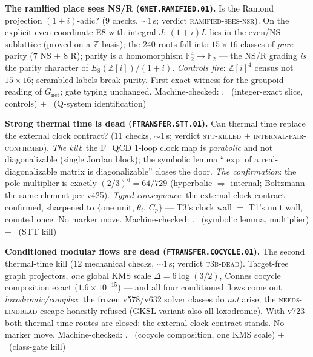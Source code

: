 \documentclass[11pt,a4paper]{article}
\newcommand{\Z}{\mathbb{Z}}
\theoremstyle{definition}
\begin{document}
\par\smallskip\noindent\textbf{The ramified place sees NS/R
(\texttt{GNET.RAMIFIED.01}).}
Is the Ramond projection $(1{+}i)$-adic? ($9$ checks, ${\sim}1$\,s;
verdict \textsc{ramified-sees-nsr}).  On the explicit
even-coordinate E8 with integral $J$: $(1{+}i)L$ lies in the even/NS
sublattice (proved on a $\Z$-basis); the $240$ roots fall into
$15\times16$ classes of \emph{pure} parity ($7$ NS $+$ $8$ R);
parity is a homomorphism $\mathbb F_2^4\to\mathbb F_2$ --- the NS/R
grading \emph{is} the parity character of $E_8(\Z[i])/(1{+}i)$.
\emph{Controls fire}: $\Z[i]^4$ census not $15\times16$; scrambled
labels break purity.  First exact witness for the groupoid reading
of $G_{\mathrm{net}}$; gate typing unchanged.
Machine-checked: .
\mE\ (integer-exact slice, controls) $+$ \mO\ (Q-system
identification)
\par\smallskip

\par\smallskip\noindent\textbf{Strong thermal time is dead
(\texttt{FTRANSFER.STT.01}).}
Can thermal time replace the external clock contract? ($11$ checks,
${\sim}1$\,s; verdict \textsc{stt-killed} $+$
\textsc{internal-pair-confirmed}).  \emph{The kill}: the F\_QCD
$1$-loop clock map is \emph{parabolic} and not diagonalizable
(single Jordan block); the symbolic lemma ``$\exp$ of a
real-diagonalizable matrix is diagonalizable'' closes the door.
\emph{The confirmation}: the pole multiplier is exactly
$(2/3)^6=64/729$ (hyperbolic $\Rightarrow$ internal; Boltzmann the
same element per v425).  \emph{Typed consequence}: the external
clock contract confirmed, sharpened to $\{$one unit, $\theta_i$,
$C_p\}$ --- T3's clock wall $=$ T1's unit wall, counted once.  No
marker move.
Machine-checked: .
\mE\ (symbolic lemma, multiplier) $+$ \mX\ (STT kill)
\par\smallskip

\par\smallskip\noindent\textbf{Conditioned modular flows are dead
(\texttt{FTRANSFER.COCYCLE.01}).}
The second thermal-time kill ($12$ mechanical checks, ${\sim}1$\,s;
verdict \textsc{t3b-dead}).  Target-free graph projectors, \emph{one}
global KMS scale $\Delta=6\log(3/2)$, Connes cocycle composition
exact ($1.6\times10^{-15}$) --- and all four conditioned flows come
out \emph{loxodromic/complex}: the frozen v578/v632 solver classes
do \emph{not} arise; the \textsc{needs-lindblad} escape honestly
refused (GKSL variant also all-loxodromic).  With v723 both
thermal-time routes are closed: the external clock contract stands.
No marker move.
Machine-checked: .
\mE\ (cocycle composition, one KMS scale) $+$ \mX\ (class-gate kill)
\par\smallskip
\end{document}
